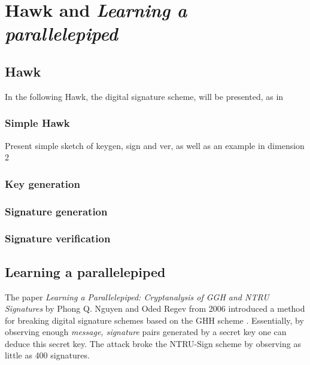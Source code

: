 \chapter{Hawk and \textit{Learning a parallelepiped}}

\section{Hawk}
In the following Hawk, the digital signature scheme, will be presented, as in \cite{hawkspec}
\subsection{Simple Hawk}
Present simple sketch of keygen, sign and ver, as well as an example in dimension 2
\subsection{Key generation}
\subsection{Signature generation}
\subsection{Signature verification}

\section{Learning a parallelepiped}
The paper \textit{Learning a Parallelepiped: Cryptanalysis of GGH and NTRU Signatures} by Phong Q. Nguyen and Oded Regev from 2006 
introduced a method for breaking digital signature schemes based on the GHH scheme \cite{hpp}. 
Essentially, by observing enough \textit{message, signature} pairs generated by a secret key one can deduce this secret key. 
The attack broke the NTRU-Sign scheme by observing as little as 400 signatures.

